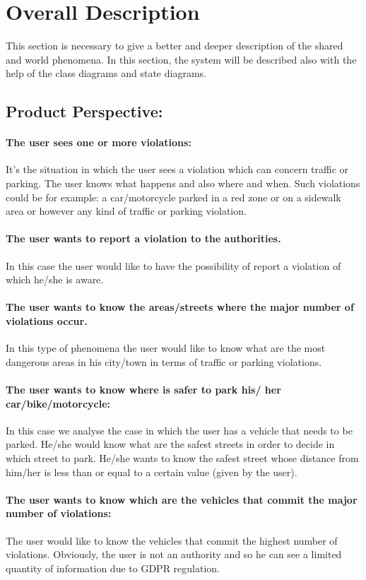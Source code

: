 \documentclass[titlepage]{article}
\begin{document}
\section{Overall Description}
This section is necessary to give a better and deeper description of the shared and world phenomena. In this section, the system will be described also with the help of the class diagrams and state diagrams.
\subsection{Product Perspective:}
\paragraph{The user sees one or more violations:}
It's the situation in which the user sees a violation which can concern traffic or parking. The user knows what happens and also where and when. Such violations could be for example: a car/motorcycle parked in a red zone or on a sidewalk area or however any kind of traffic or parking violation.
\paragraph{The user wants to report a violation to the 					  authorities.}
In this case the user would like to have the possibility of report a violation of which he/she is aware. 
\paragraph{The user wants to know the areas/streets where the 
	      major number of violations occur.}
In this type of phenomena the user would like to know what are the most dangerous areas in his city/town in terms of traffic or parking violations. 
\paragraph{The user wants to know where is safer to park his/			  her car/bike/motorcycle:}
In this case we analyse the case in which the user has a vehicle that needs to be parked. He/she would know what are the safest streets in order to decide in which street to park. He/she wants to know the safest street whose distance from him/her is less than or equal to a certain value (given by the user).
\paragraph{The user wants to know which are the vehicles that       		  commit the major number of violations:}
The user would like to know the vehicles that commit the highest number of violations. Obviously, the user is not an authority and so he can see a limited quantity of information due to GDPR regulation.
\end{document}
